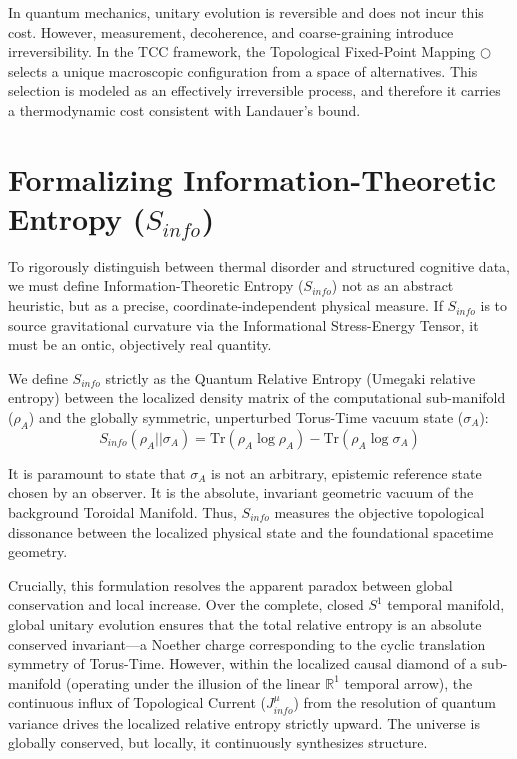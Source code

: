 \documentclass[12pt,openany]{book}
\theoremstyle{plain}
\theoremstyle{definition}
\theoremstyle{remark}
\begin{document}
In quantum mechanics, unitary evolution is reversible and does not incur this
cost. However, measurement, decoherence, and coarse-graining introduce
irreversibility. In the TCC framework, the Topological Fixed-Point Mapping
$\bigcirc$ selects a unique macroscopic configuration from a space of
alternatives. This selection is modeled as an effectively irreversible process,
and therefore it carries a thermodynamic cost consistent with Landauer's bound.

\section{Formalizing Information-Theoretic Entropy ($S_{info}$)}
To rigorously distinguish between thermal disorder and structured cognitive data, we must define Information-Theoretic Entropy ($S_{info}$) not as an abstract heuristic, but as a precise, coordinate-independent physical measure. If $S_{info}$ is to source gravitational curvature via the Informational Stress-Energy Tensor, it must be an ontic, objectively real quantity. 

We define $S_{info}$ strictly as the Quantum Relative Entropy (Umegaki relative entropy) between the localized density matrix of the computational sub-manifold ($\rho_A$) and the globally symmetric, unperturbed Torus-Time vacuum state ($\sigma_A$):
$$ S_{info}(\rho_A || \sigma_A) = \text{Tr}(\rho_A \log \rho_A) - \text{Tr}(\rho_A \log \sigma_A) $$

It is paramount to state that $\sigma_A$ is not an arbitrary, epistemic reference state chosen by an observer. It is the absolute, invariant geometric vacuum of the background Toroidal Manifold. Thus, $S_{info}$ measures the objective topological dissonance between the localized physical state and the foundational spacetime geometry.

Crucially, this formulation resolves the apparent paradox between global conservation and local increase. Over the complete, closed $S^1$ temporal manifold, global unitary evolution ensures that the total relative entropy is an absolute conserved invariant---a Noether charge corresponding to the cyclic translation symmetry of Torus-Time. However, within the localized causal diamond of a sub-manifold (operating under the illusion of the linear $\mathbb{R}^1$ temporal arrow), the continuous influx of Topological Current ($J_{info}^\mu$) from the resolution of quantum variance drives the localized relative entropy strictly upward. The universe is globally conserved, but locally, it continuously synthesizes structure.
\end{document}
